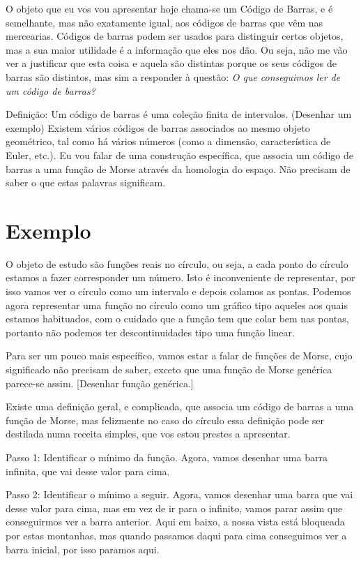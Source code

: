 \documentclass[12pt]{article}
\theoremstyle{nonumberplain}
\begin{document}
O objeto que eu vos vou apresentar hoje chama-se um Código de Barras, e é semelhante, mas não exatamente igual, aos códigos de barras que vêm nas mercearias. Códigos de barras podem ser usados para distinguir certos objetos, mas a sua maior utilidade é a informação que eles nos dão. Ou seja, não me vão ver a justificar que esta coisa e aquela são distintas porque os seus códigos de barras são distintos, mas sim a responder à questão: \emph{O que conseguimos ler de um código de barras?}

Definição: Um código de barras é uma coleção finita de intervalos. (Desenhar um exemplo) Existem vários códigos de barras associados ao mesmo objeto geométrico, tal como há vários números (como a dimensão, característica de Euler, etc.). Eu vou falar de uma construção específica, que associa um código de barras a uma função de Morse através da homologia do espaço. Não precisam de saber o que estas palavras significam.


\section{Exemplo}

O objeto de estudo são funções reais no círculo, ou seja, a cada ponto do círculo estamos a fazer corresponder um número. Isto é inconveniente de representar, por isso vamos ver o círculo como um intervalo e depois colamos as pontas. Podemos agora representar uma função no círculo como um gráfico tipo aqueles aos quais estamos habituados, com o cuidado que a função tem que colar bem nas pontas, portanto não podemos ter descontinuidades tipo uma função linear.

Para ser um pouco mais específico, vamos estar a falar de funções de Morse, cujo significado não precisam de saber, exceto que uma função de Morse genérica parece-se assim. [Desenhar função genérica.]

Existe uma definição geral, e complicada, que associa um código de barras a uma função de Morse, mas felizmente no caso do círculo essa definição pode ser destilada numa receita simples, que vos estou prestes a apresentar.

Passo 1: Identificar o mínimo da função. Agora, vamos desenhar uma barra infinita, que vai desse valor para cima.

Passo 2: Identificar o mínimo a seguir. Agora, vamos desenhar uma barra que vai desse valor para cima, mas em vez de ir para o infinito, vamos parar assim que conseguirmos ver a barra anterior. Aqui em baixo, a nossa vista está bloqueada por estas montanhas, mas quando passamos daqui para cima conseguimos ver a barra inicial, por isso paramos aqui.
\end{document}
